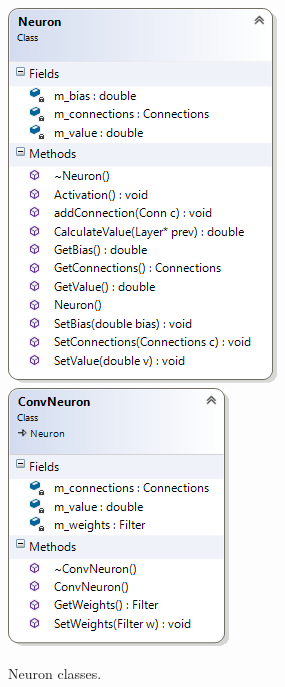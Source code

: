\documentclass[10pt]{article}
\begin{document}
		\begin{figure}[h]
			\includegraphics[scale=1]{img/classNeuron}
			\includegraphics[scale=1]{img/classConvNeuron}
			\caption{Neuron classes.}
			\label{fig:ncd}
		\end{figure}
		
\end{document}
